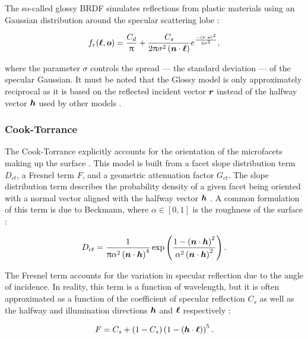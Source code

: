 The so-called glossy BRDF simulates reflections from plastic materials using an Gaussian distribution around the specular scattering lobe \cite{duvenhage2013}:

\begin{equation} \label{eq:brdf_glossy}
  f_r(\bm{\ell}, \bm{o}) = \frac{C_d}{\uppi} + \frac{C_s}{2\uppi \sigma^2 \left(\bm{n} \cdot \bm{\ell}\right)}  e^{\frac{-\left( \bm{r} \cdot \bm{o} \right)^2}{2\sigma^2}},
\end{equation}

where the parameter $\sigma$ controls the spread --- the standard deviation --- of the specular Gaussian. It must be noted that the Glossy model is only approximately reciprocal as it is based on the reflected incident vector $\bm{r}$ instead of the halfway vector $\bm{h}$ used by other models \cite{duvenhage2013}.

\subsubsection{Cook-Torrance}

The Cook-Torrance explicitly accounts for the orientation of the microfacets making up the surface \cite{cook1982}. This model is built from a facet slope distribution term $D_{ct}$, a Fresnel term $F$, and a geometric attenuation factor $G_{ct}$. The slope distribution term describes the probability density of a given facet being oriented with a normal vector aligned with the halfway vector $\bm{h}$ \cite{cook1982}. A common formulation of this term is due to Beckmann, where $\alpha \in [0, 1]$ is the roughness of the surface \cite{cook1982}:

\begin{equation} \label{eq:d_beckmann}
  D_{ct} = \frac{1}{\uppi \alpha^2 \left( \bm{n} \cdot \bm{h} \right)^4} \exp\left( \frac{1 - \left(\bm{n} \cdot \bm{h}\right)^2}{\alpha^2 \left( \bm{n} \cdot \bm{h} \right)^2} \right).
\end{equation}

The Fresnel term accounts for the variation in specular reflection due to the angle of incidence. In reality, this term is a function of wavelength, but it is often approximated as a function of the coefficient of specular reflection $C_s$ as well as the halfway and illumination directions $\bm{h}$ and $\bm{\ell}$ respectively \cite{cook1982}:

\begin{equation} \label{eq:fresnel_approx}
  F = C_s + \left( 1 - C_s \right) \left( 1 - \left( \bm{h} \cdot \bm{\ell} \right) \right) ^ 5.
\end{equation}

